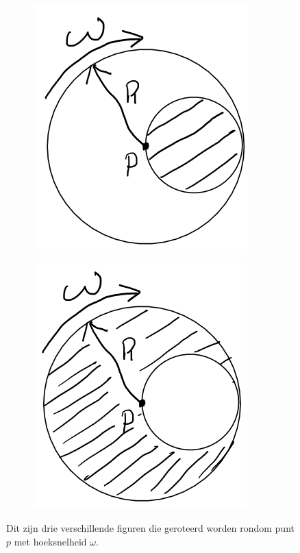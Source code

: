 \documentclass[11pt]{article}
\begin{document}
\begin{figure}
\begin{subfigure}[b]{0.3\textwidth}
		\includegraphics[width=\textwidth]{Schijf2}
		\caption{}
		\label{fig:Schijf2}
	\end{subfigure}
	\hfill
	\begin{subfigure}[b]{0.3\textwidth}
		\centering
		\includegraphics[width=\textwidth]{Schijf3}
		\caption{}
		\label{fig:Schijf3}
	\end{subfigure}
	\caption{Dit zijn drie verschillende figuren die geroteerd worden rondom punt $p$ met hoeksnelheid $\omega$.}
	\label{fig:Schijven}
\end{figure}
\end{document}
